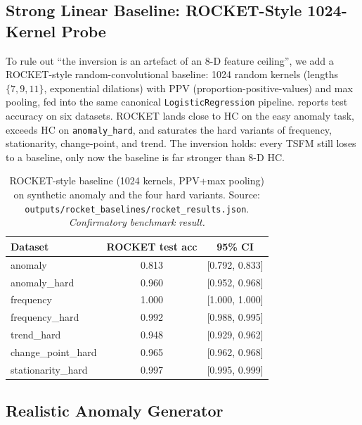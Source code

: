 \documentclass{article}
\begin{document}
\subsection{Strong Linear Baseline: ROCKET-Style 1024-Kernel Probe}
\label{sec:appendix_rocket}

To rule out ``the inversion is an artefact of an 8-D feature ceiling'', we add a ROCKET-style \cite{Dempster2020} random-convolutional baseline: 1024 random kernels (lengths $\{7,9,11\}$, exponential dilations) with PPV (proportion-positive-values) and max pooling, fed into the same canonical \texttt{LogisticRegression} pipeline.  reports test accuracy on six datasets. ROCKET lands close to HC on the easy anomaly task, exceeds HC on \texttt{anomaly\_hard}, and saturates the hard variants of frequency, stationarity, change-point, and trend. The inversion holds: every TSFM still loses to a baseline, only now the baseline is far stronger than 8-D HC.

\begin{table}[htbp]
\caption{ROCKET-style baseline (1024 kernels, PPV+max pooling) on synthetic anomaly and the four hard variants. Source: \texttt{outputs/rocket\_baselines/rocket\_results.json}. \emph{Confirmatory benchmark result.}}
\label{tab:rocket_baseline}
\centering
\small
\begin{tabular}{lcc}
\toprule
Dataset & ROCKET test acc & 95\% CI \\
\midrule
anomaly             & 0.813 & [0.792, 0.833] \\
anomaly\_hard        & 0.960 & [0.952, 0.968] \\
frequency           & 1.000 & [1.000, 1.000] \\
frequency\_hard      & 0.992 & [0.988, 0.995] \\
trend\_hard          & 0.948 & [0.929, 0.962] \\
change\_point\_hard   & 0.965 & [0.962, 0.968] \\
stationarity\_hard   & 0.997 & [0.995, 0.999] \\
\bottomrule
\end{tabular}
\end{table}

\subsection{Realistic Anomaly Generator}
\label{sec:appendix_realistic_anomaly}
\end{document}
